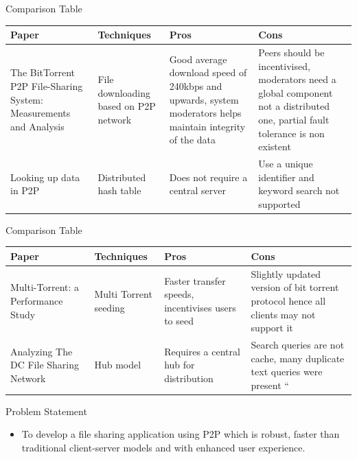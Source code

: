 \documentclass[9pt]{beamer}
\begin{document}
\begin{frame}{Comparison Table}
    \begin{tabularx}{1.0\textwidth} { 
        | >{\centering\arraybackslash}X
        | >{\centering\arraybackslash}X
        | >{\centering\arraybackslash}X
        | >{\centering\arraybackslash}X | }
        \hline Paper & Techniques & Pros & Cons \\
        \hline The BitTorrent P2P File-Sharing System: Measurements and Analysis & File downloading based on P2P network & Good average download speed of 240kbps and upwards, system moderators helps maintain integrity of the data & Peers should be incentivised, moderators need a global component not a distributed one, partial fault tolerance is non existent \\
        \hline Looking up data in P2P & Distributed hash table & Does not require a central server & Use a unique identifier and keyword search not supported \\
        \hline
    \end{tabularx}
\end{frame}

\begin{frame}{Comparison Table}
    \begin{tabularx}{1.0\textwidth} { 
        | >{\centering\arraybackslash}X
        | >{\centering\arraybackslash}X
        | >{\centering\arraybackslash}X
        | >{\centering\arraybackslash}X | }
        \hline Paper & Techniques & Pros & Cons \\
        \hline Multi-Torrent: a Performance Study & Multi Torrent seeding & Faster transfer speeds, incentivises users to seed & Slightly updated version of bit torrent protocol hence all clients may not support it \\
        \hline Analyzing The DC File Sharing Network & Hub model & Requires a central hub for distribution & Search queries are not cache, many duplicate text queries were present ``\\
        \hline
    \end{tabularx}
\end{frame}

\begin{frame}{Problem Statement}
    \begin{itemize}
        \item To develop a file sharing application using P2P which is robust, faster than traditional client-server models and with enhanced user experience.
    \end{itemize}
\end{frame}
\end{document}
